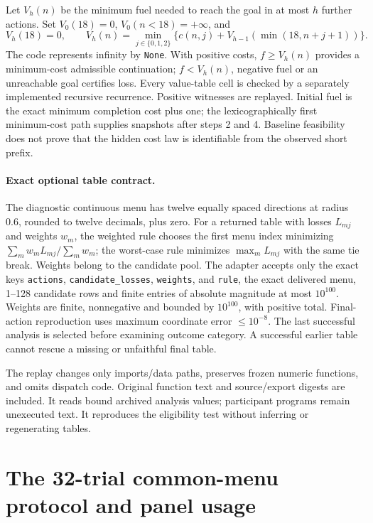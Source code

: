 Let $V_h(n)$ be the minimum fuel needed to reach the goal in at most
$h$ further actions. Set $V_0(18)=0$, $V_0(n<18)=+\infty$, and
\begin{equation}
V_h(18)=0,\qquad
V_h(n)=\min_{j\in\{0,1,2\}}
\{c(n,j)+V_{h-1}(\min(18,n+j+1))\}.
\end{equation}
The code represents infinity by \texttt{None}. With positive costs,
$f\geq V_h(n)$ provides a minimum-cost admissible continuation;
$f<V_h(n)$, negative fuel or an unreachable goal certifies loss.
Every value-table cell is checked by a separately implemented recursive
recurrence. Positive witnesses are replayed. Initial fuel is the exact
minimum completion cost plus one; the lexicographically first
minimum-cost path supplies snapshots after steps 2 and 4. Baseline
feasibility does not prove that the hidden cost law is identifiable from
the observed short prefix.

\paragraph{Exact optional table contract.}
The diagnostic continuous menu has twelve equally spaced directions at
radius $0.6$, rounded to twelve decimals, plus zero. For a returned
table with losses $L_{mj}$ and weights $w_m$, the weighted rule chooses
the first menu index minimizing $\sum_m w_mL_{mj}/\sum_mw_m$; the
worst-case rule minimizes $\max_m L_{mj}$ with the same tie break.
Weights belong to the candidate pool. The adapter accepts only the
exact keys \texttt{actions}, \texttt{candidate\_losses},
\texttt{weights}, and \texttt{rule}, the exact delivered menu, 1--128
candidate rows and finite entries of absolute magnitude at most
$10^{100}$. Weights are finite, nonnegative and bounded by $10^{100}$,
with positive total. Final-action reproduction uses maximum coordinate
error $\leq10^{-8}$. The last successful analysis is selected before
examining outcome category. A successful earlier table cannot rescue
a missing or unfaithful final table.

The replay changes only imports/data paths, preserves frozen numeric
functions, and omits dispatch code. Original function text and
source/export digests are included. It reads bound archived analysis
values; participant programs remain unexecuted text. It reproduces the
eligibility test without inferring or regenerating tables.


\section{The 32-trial common-menu protocol and panel usage}
\label{app:common-menu-protocol}

